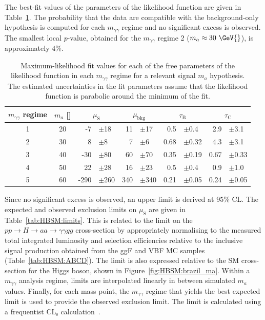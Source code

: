 The best-fit values of the parameters of the likelihood function are given in Table~\ref{tab:HBSM:MLE}.
The probability that the data are compatible with the background-only hypothesis is computed for each $m_{\gamma\gamma}$ regime and no significant 
excess is observed. The smallest local $p$-value, obtained for the $m_{\gamma\gamma}$ regime 2 ($m_a\approx30~\GeV{}$), is approximately 4\%.
\begin{table}[t]
  \begin{center}
    \caption{Maximum-likelihood fit values for each of the free parameters of the likelihood function 
      in each $m_{\gamma\gamma}$ regime for a relevant signal $m_a$ hypothesis.
      The estimated uncertainties in the fit parameters assume
      that the likelihood function is parabolic around the minimum of the fit.
    }
    \label{tab:HBSM:MLE}
          {\footnotesize
	    \begin{tabular}{
                cc
                r@{}lr@{}l
                r@{}lr@{}l
              }
	      \hline
              $m_{\gamma\gamma}$ regime & $m_a$ [\GeV{}] &   \multicolumn{2}{c}{$\mu_\text{S}$} &   \multicolumn{2}{c}{$\mu_\text{bkg}$}  &   \multicolumn{2}{c}{$\tau_\text{B}$} & \multicolumn{2}{c}{$\tau_\text{C}$} \\
	      \hline
              1 & 20 &  -7&$\pm$18    & 11&$\pm$17   & 0.5 &$\pm$0.4 &  2.9&$\pm$3.1   \\
              2 & 30 &  8&$\pm$8      & 7&$\pm$6     & 0.68 &$\pm$0.32 & 4.3&$\pm$3.1   \\
              3 & 40 &  -30&$\pm$80   & 60&$\pm$70   & 0.35 &$\pm$0.19 & 0.67&$\pm$0.33 \\
              4 & 50 &  22&$\pm$28    & 16&$\pm$23   & 0.5 &$\pm$0.4 & 0.9&$\pm$1.0   \\
              5 & 60 &  -290&$\pm$260 & 340&$\pm$340 & 0.21&$\pm$0.05 & 0.24&$\pm$0.05 \\
	      \hline
	    \end{tabular}
          }
  \end{center}
\end{table}
Since no significant excess is observed, an upper limit is derived at 95\% CL.            
The expected and observed exclusion limits on $\mu_\text{S}$ are given in Table~\ref{tab:HBSM:limits}.
This is related to the limit on the $pp\to H\to aa \to \gamma\gamma gg$ cross-section by appropriately normalising to the measured total integrated luminosity 
and selection efficiencies relative to the inclusive signal production obtained from the ggF and VBF MC samples (Table~\ref{tab:HBSM:ABCD}).
The limit is also expressed relative to the SM cross-section for the Higgs boson, shown in Figure~\ref{fig:HBSM:brazil_ma}.
Within a $m_{\gamma\gamma}$ analysis regime, limits are interpolated linearly in between simulated $m_a$ values.
Finally, for each mass point, the $m_{\gamma\gamma}$ regime that yields the best expected limit is used to provide the observed exclusion limit.
The limit is calculated using a frequentist $\text{CL}_\text{s}$ calculation~\cite{Read:2002hq}. 

